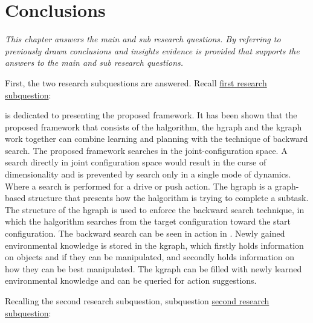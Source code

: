 \chapter{Conclusions}%
\label{chap:conclusion}
\textit{This chapter answers the main and sub research questions. By referring to previously drawn conclusions and insights evidence is provided that supports the answers to the main and sub research questions.\bs}

First, the two research subquestions are answered. Recall \hyperref[researchsubquestion:does_it_work]{first research subquestion}:\vspace{0.5\baselineskip}\\
\textit{\vspace{0.5\baselineskip}}\bs

 is dedicated to presenting the proposed framework. It has been shown that the proposed framework that consists of the \ac{halgorithm}, the \ac{hgraph} and the \ac{kgraph} work together can combine learning and planning with the technique of backward search. The proposed framework searches in the joint-configuration space. A search directly in joint configuration space would result in the curse of dimensionality and is prevented by search only in a single mode of dynamics. Where a search is performed for a drive or push action. The \ac{hgraph} is a graph-based structure that presents how the \ac{halgorithm} is trying to complete a subtask. The structure of the \ac{hgraph} is used to enforce the backward search technique, in which the \ac{halgorithm} searches from the target configuration toward the start configuration. The backward search can be seen in action in . Newly gained environmental knowledge is stored in the \ac{kgraph}, which firstly holds information on objects and if they can be manipulated, and secondly holds information on how they can be best manipulated. The \ac{kgraph} can be filled with newly learned environmental knowledge and can be queried for action suggestions.\bs

Recalling the second research subquestion, subquestion \hyperref[researchsubquestion:does_it_compare]{second research subquestion}:\vspace{0.5\baselineskip}\\
\textit{}\vspace{0.5\baselineskip}\bs



